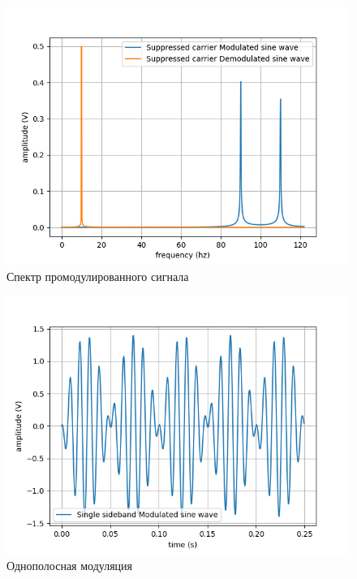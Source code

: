 \begin{figure}[H]
	\begin{center}
		\includegraphics[scale=0.7]{../out/Suppressed_frequency.png}
		\caption{Спектр промодулированного сигнала} 
		\label{pic:sine_freq_1} %
	\end{center}
\end{figure}

\begin{figure}[H]
	\begin{center}
		\includegraphics[scale=0.7]{../out/Single_time.png}
		\caption{Однополосная модуляция} 
		\label{pic:sine_time_2} %
	\end{center}
\end{figure}

